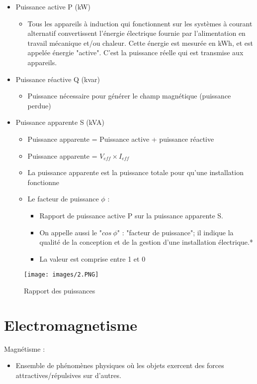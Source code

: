 \documentclass[a4paper]{article}
\begin{document}
\begin{itemize}
    \item Puissance active P (kW)
    \begin{itemize}
        \item Tous les appareils à induction qui fonctionnent sur les systèmes à courant alternatif convertissent l'énergie électrique fournie par
        l'alimentation en travail mécanique et/ou chaleur. Cette énergie est mesurée en kWh, et est appelée énergie "active".
        C’est la puissance réelle qui est transmise aux appareils.
    \end{itemize}
    \item Puissance réactive Q (kvar)
    \begin{itemize}
        \item Puissance nécessaire pour générer le champ magnétique (puissance perdue)
    \end{itemize}
    \item Puissance apparente S (kVA)
    \begin{itemize}
        \item Puissance apparente = Puissance active + puissance réactive
        \item Puissance apparente = $V_{eff} \times I_{eff}$
        \item La puissance apparente est la puissance totale pour qu'une installation fonctionne
        \item Le facteur de puissance $\phi$ :
        \begin{itemize}
            \item Rapport de puissance active P sur la puissance apparente S.
            \item On appelle aussi le "$cos\ \phi$" : "facteur de puissance"; il indique la qualité de la conception et de la gestion d'une installation électrique.*
            \item La valeur est comprise entre 1 et 0
        \end{itemize}
    \end{itemize}
\end{itemize}

\begin{figure}[H]
    \centering
    \texttt{[image: images/2.PNG]}
    \caption{Rapport des puissances}
\end{figure}

\newpage
\section{Electromagnetisme}
Magnétisme :
\begin{itemize}
    \item Ensemble de phénomènes physiques où les objets exercent des forces attractives/répulsives sur d'autres. 
\end{itemize}
\vspace{0.5cm}
\end{document}
